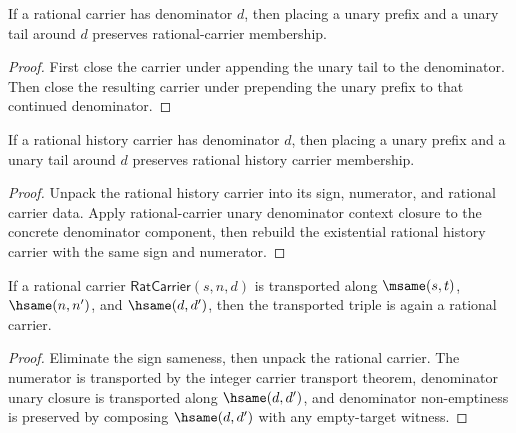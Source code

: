 \begin{theorem}
\label{thm:rat-carrier-unary-denominator-context-closed}
If a rational carrier has denominator \(d\), then placing a unary prefix and a
unary tail around \(d\) preserves rational-carrier membership.
\end{theorem}
\begin{proof}
First close the carrier under appending the unary tail to the denominator.
Then close the resulting carrier under prepending the unary prefix to that
continued denominator.
\end{proof}

\begin{theorem}
\label{thm:rat-history-carrier-unary-denominator-context-closed}
If a rational history carrier has denominator \(d\), then placing a unary
prefix and a unary tail around \(d\) preserves rational history carrier
membership.
\end{theorem}
\begin{proof}
Unpack the rational history carrier into its sign, numerator, and rational
carrier data. Apply rational-carrier unary denominator context closure to the
concrete denominator component, then rebuild the existential rational history
carrier with the same sign and numerator.
\end{proof}

\begin{theorem}
\label{thm:rat-carrier-hsame-transport}
If a rational carrier \(\mathsf{RatCarrier}(s,n,d)\) is transported along
\(\msame(s,t)\), \(\hsame(n,n')\), and \(\hsame(d,d')\), then the transported
triple is again a rational carrier.
\end{theorem}
\begin{proof}
Eliminate the sign sameness, then unpack the rational carrier. The numerator
is transported by the integer carrier transport theorem, denominator unary
closure is transported along \(\hsame(d,d')\), and denominator non-emptiness is
preserved by composing \(\hsame(d,d')\) with any empty-target witness.
\end{proof}
